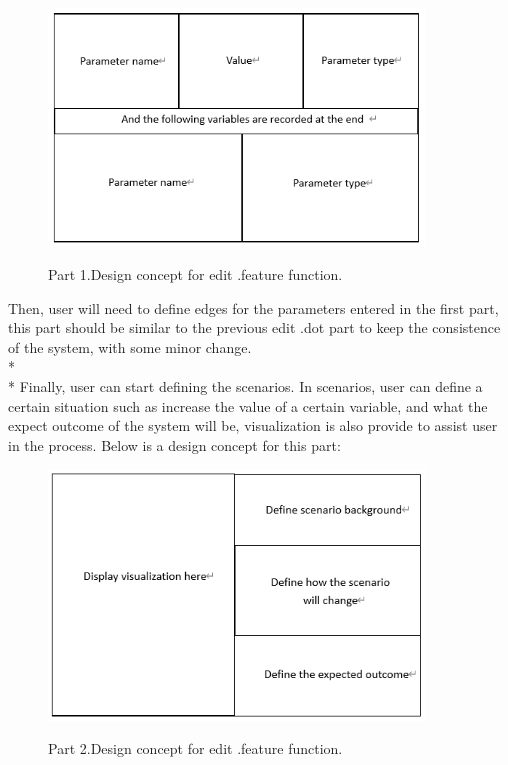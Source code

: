 \begin{figure}[H]
	\centering
	\includegraphics[width=10cm]{figures/editFeature1.png}\\
	\caption{Part 1.Design concept for edit .feature function.}
	\label{fig:figure7}
\end{figure}
\noindent 
Then, user will need to define edges for the parameters entered in the first part, this part should be similar to the previous edit .dot part to keep the consistence of the system, with some minor change.\\*\\*
Finally, user can start defining the scenarios. In scenarios, user can define a certain situation such as increase the value of a certain variable, and what the expect outcome of the system will be, visualization is also provide to assist user in the process. Below is a design concept for this part:

\begin{figure}[H]
	\centering
	\includegraphics[width=10cm]{figures/editFeature2.png}\\
	\caption{Part 2.Design concept for edit .feature function.}
	\label{fig:figure8}
\end{figure}





